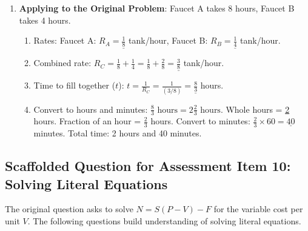 \documentclass[12pt]{article}
\begin{document}
\begin{enumerate}[label=3.\arabic*]
\begin{enumerate}[label=\alph*)]
    \end{enumerate}
    \item \textbf{Applying to the Original Problem}: Faucet A takes 8 hours, Faucet B takes 4 hours.
    \begin{enumerate}[label=\alph*)]
        \item Rates: Faucet A: \(R_A = \underline{\frac{1}{8}}\) tank/hour, Faucet B: \(R_B = \underline{\frac{1}{4}}\) tank/hour.
        \item Combined rate: \( R_C = \frac{1}{8} + \frac{1}{4} = \frac{1}{8} + \frac{2}{8} = \underline{\frac{3}{8}} \) tank/hour.
        \item Time to fill together (\(t\)): \( t = \frac{1}{R_C} = \frac{1}{(3/8)} = \underline{\frac{8}{3}} \) hours.
        \item Convert to hours and minutes: \( \frac{8}{3} \text{ hours} = 2 \frac{2}{3} \text{ hours}\).
        Whole hours = \underline{2} hours.
        Fraction of an hour = \( \frac{2}{3} \) hours. Convert to minutes: \( \frac{2}{3} \times 60 = \underline{40} \) minutes.
        Total time: 2 hours and 40 minutes.
    \end{enumerate}
\end{enumerate}

\subsection*{Scaffolded Question for Assessment Item 10: Solving Literal Equations}
The original question asks to solve \( N = S(P - V) - F \) for the variable cost per unit \( V \). The following questions build understanding of solving literal equations.
\end{document}
